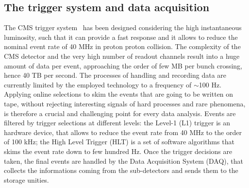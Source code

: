 
\subsection{The trigger system and data acquisition}
The CMS trigger system~\cite{TRIG-TDR} has been designed considering the high instantaneous luminosity, such that it can provide a fast response and it allows to reduce the nominal event rate of 40 MHz in proton proton collision. The complexity of the CMS detector and the very high number of readout channels result into a huge amount of data per event, approaching the order of few MB per bunch crossing, hence 40 TB per second. The processes of handling and recording data are currently limited by the employed technology to a frequency of $\sim$100 Hz. Applying online selections to skim the events that are going to be written on tape, without rejecting interesting signals of hard processes and rare phenomena, is therefore a crucial and challenging point for every data analysis. Events are filtered by trigger selections at different levels: the Level-1 (L1) trigger is an hardware device, that allows to reduce the event rate from 40 MHz to the order of 100 kHz; the High Level Trigger (HLT) is a set of software algorithms that skims the event rate down to few hundred Hz. Once the trigger decisions are taken, the final events are handled by the Data Acquisition System (DAQ), that collects the informations coming from the sub-detectors and sends them to the storage unities.

